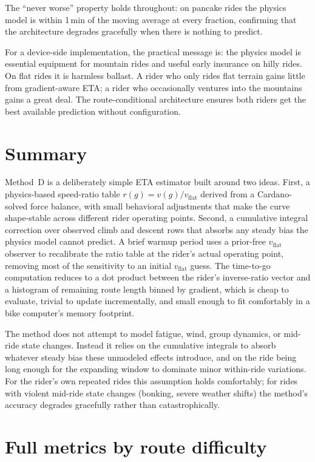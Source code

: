 \documentclass[11pt,a4paper]{article}
\begin{document}
The ``never worse'' property holds throughout: on pancake rides the
physics model is within 1\,\si{\minute} of the moving average at
every fraction, confirming that the architecture degrades gracefully
when there is nothing to predict.

For a device-side implementation, the practical message is: the
physics model is essential equipment for mountain rides and useful
early insurance on hilly rides. On flat rides it is harmless ballast.
A rider who only rides flat terrain gains little from gradient-aware
ETA; a rider who occasionally ventures into the mountains gains a
great deal. The route-conditional architecture ensures both riders
get the best available prediction without configuration.


\section{Summary}

Method~D is a deliberately simple ETA estimator built around two
ideas. First, a physics-based speed-ratio table $r(g) = v(g) /
v_{\text{flat}}$ derived from a Cardano-solved force balance, with
small behavioral adjustments that make the curve shape-stable across
different rider operating points. Second, a cumulative integral
correction over observed climb and descent rows that absorbs any
steady bias the physics model cannot predict. A brief warmup period
uses a prior-free $v_{\text{flat}}$ observer to recalibrate the
ratio table at the rider's actual operating point, removing most of
the sensitivity to an initial $v_{\text{flat}}$ guess. The
time-to-go computation reduces to a dot product between the rider's
inverse-ratio vector and a histogram of remaining route length
binned by gradient, which is cheap to evaluate, trivial to update
incrementally, and small enough to fit comfortably in a bike
computer's memory footprint.

The method does not attempt to model fatigue, wind, group dynamics,
or mid-ride state changes. Instead it relies on the cumulative
integrals to absorb whatever steady bias these unmodeled effects
introduce, and on the ride being long enough for the expanding
window to dominate minor within-ride variations. For the rider's own
repeated rides this assumption holds comfortably; for rides with
violent mid-ride state changes (bonking, severe weather shifts) the
method's accuracy degrades gracefully rather than catastrophically.

\appendix

\section{Full metrics by route difficulty}
\label{app:metrics}
\end{document}
